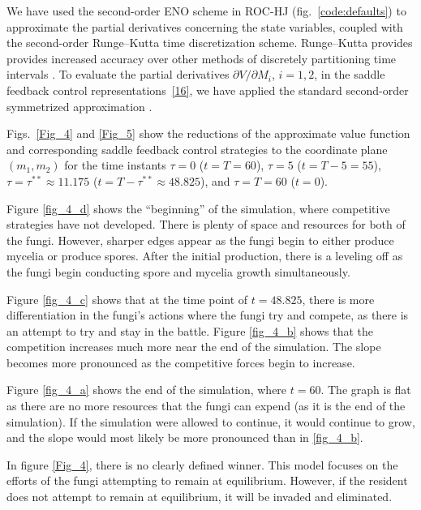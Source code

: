 \documentclass[11pt]{amsart}
\begin{document}
We have used the second-order ENO scheme in ROC-HJ (fig.~\ref{code:defaults}) to approximate the partial
derivatives concerning the state variables, coupled with the 
second-order Runge--Kutta time discretization scheme. Runge--Kutta provides provides increased accuracy over other methods of discretely partitioning time intervals \cite{ROCHJ2019}.
To evaluate the partial derivatives $ \partial V / \partial M_i $, $ i = 1,2 $,
in the saddle feedback control representations~\cref{16}, we have applied the
standard second-order symmetrized approximation
\cite[\S 5.7]{PressTeukolskyVetterlingFlannery2007}.

Figs.~\ref{Fig_4} and \ref{Fig_5} show the reductions of the approximate
value function and corresponding saddle feedback control strategies to the
coordinate plane $ (m_1, m_2) $ for the time instants 
$ \tau = 0 $ ($ t = T = 60 $), $ \tau = 5 $ ($ t = T - 5 = 55 $),
$ \tau = \tau^{**} 
\approx 11.175 $ ($ t = T - \tau^{**} \approx 48.825 $),
and $ \tau = T = 60 $ ($ t = 0 $). 


Figure \ref{fig_4_d} shows the ``beginning'' of the simulation, where competitive strategies have not developed. There is plenty of space and resources for both of the fungi. However, sharper edges appear as the fungi begin to either produce mycelia or produce spores. After the initial production, there is a leveling off as the fungi begin conducting spore and mycelia growth simultaneously.

Figure \ref{fig_4_c} shows that at the time point of $t=48.825$, there is more differentiation in the fungi's actions where the fungi try and compete, as there is an attempt to try and stay in the battle. Figure \ref{fig_4_b} shows that the competition increases much more near the end of the simulation. The slope becomes more pronounced as the competitive forces begin to increase.

Figure \ref{fig_4_a} shows the end of the simulation, where $t=60$. The graph is flat as there are no more resources that the fungi can expend (as it is the end of the simulation). If the simulation were allowed to continue, it would continue to grow, and the slope would most likely be more pronounced than in \ref{fig_4_b}. 

In figure \ref{Fig_4}, there is no clearly defined winner. This model focuses on the efforts of the fungi attempting to remain at equilibrium. However, if the resident does not attempt to remain at equilibrium, it will be invaded and eliminated.


\end{document}

